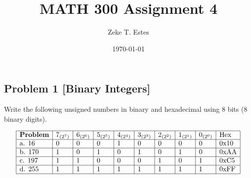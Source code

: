 \documentclass[11pt]{article}
\title{MATH 300 Assignment 4}
\author{Zeke T. Estes}
\date{\today}
\begin{document}
\maketitle

\subsection*{Problem 1 [Binary Integers]}
Write the following unsigned numbers in binary and hexadecimal using 8 bits (8 binary digits).

\begin{align*}
	\begin{array}{ | l | l | l | l | l | l | l | l | l | l | }
	\hline
	\textbf{Problem} & $$7_{(2^7)}$$ & $$6_{(2^6)}$$ & $$5_{(2^5)}$$ & $$4_{(2^4)}$$ & $$3_{(2^3)}$$ & $$2_{(2^2)}$$ & $$1_{(2^1)}$$ & $$0_{(2^0)}$$ & \textup{Hex} \\ \hline
	\textup{a. 16}  & 0 & 0 & 0 & 1 & 0 & 0 & 0 & 0 & \textup{0x10} \\ \hline
	\textup{b. 170} & 1 & 0 & 1 & 0 & 1 & 0 & 1 & 0 & \textup{0xAA} \\ \hline
	\textup{c. 197} & 1 & 1 & 0 & 0 & 0 & 1 & 0 & 1 & \textup{0xC5} \\ \hline
	\textup{d. 255} & 1 & 1 & 1 & 1 & 1 & 1 & 1 & 1 & \textup{0xFF} \\ \hline
	\end{array}
\end{align*}
\end{document}
